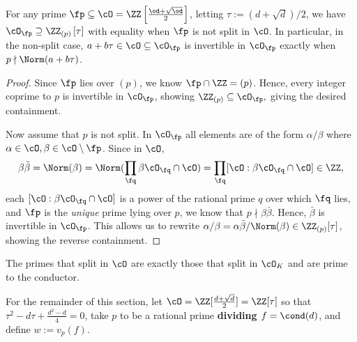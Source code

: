 \documentclass[11pt, proquest]{uwthesis}
\begin{document}
\begin{lemma}\label{lemma:ZpLocal}
  For any prime $\fp\subseteq \cO = \ZZ\left[\frac{\od +\sqrt{\od }}{2}\right]$, letting $\tau:= (d+\sqrt{d})/2$, we have $\cO_\fp \supseteq \ZZ_{(p)}\left[\tau\right]$ with equality when $\fp$ is not split in $\cO$. In particular, in the non-split case, $a+b\tau\in\cO\subseteq\cO_\fp$ is invertible in $\cO_\fp$ exactly when $p\nmid \Norm(a+b\tau)$.
\end{lemma}

\begin{proof}
  Since $\fp$ lies over $(p)$, we know $\fp\cap \ZZ = (p)$.
  Hence, every integer coprime to $p$ is invertible in $\cO_\fp$, showing $\ZZ_{(p)}\subseteq
    \cO_\fp,$ giving the desired containment.

  Now assume that $p$ is not split. In $\cO_\fp$ all elements are of the form $\alpha/\beta$ where $\alpha\in \cO, \beta\in\cO\setminus\fp$.
  Since in $\cO$,
  \[
    \beta\bar\beta = \Norm(\beta) = \Norm(\prod_\fq \beta\cO_{\fq}\cap \cO) = \prod_{\fq} [\cO:\beta\cO_\fq\cap\cO]\in\ZZ,
  \] each $[\cO:\beta\cO_\fq\cap\cO]$ is a power of the rational prime $q$ over which $\fq$ lies, and $\fp$ is the {\it unique} prime lying over $p$, we know that $p\nmid\beta\bar\beta$. Hence, $\bar\beta$ is invertible in $\cO_\fp$. This allows us to rewrite $\alpha/\beta = \alpha\bar\beta/\Norm(\beta)\in\ZZ_{(p)}[\tau]$, showing the reverse containment.
\end{proof}

\begin{remark}\label{rmk:SplitReqs}
  The primes that split in $\cO$ are exactly those that split in $\cO_K$ and are prime to the conductor.
\end{remark}

For the remainder of this section, let $\cO = \ZZ[\frac{d+\sqrt{d}}{2}] = \ZZ[\tau]$ so that $\tau^2  -d\tau + \frac{d^2-d}{4} = 0$, take $p$ to be a rational prime {\bf dividing $f=\cond(d)$}, and define $w:= v_p(f)$.
\end{document}
